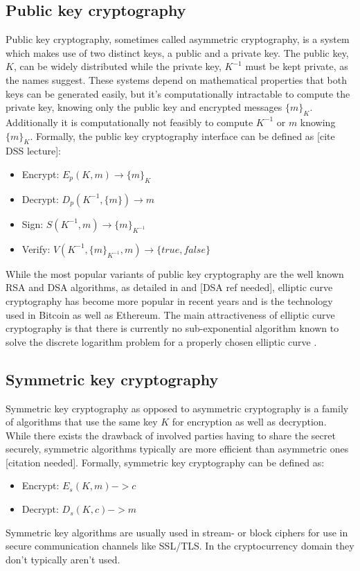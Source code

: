 \documentclass[12pt,msc,a4paper,oneside]{ucl_thesis}
\begin{document}
\subsection{Public key cryptography}
Public key cryptography, sometimes called asymmetric cryptography, is a system which makes use of two distinct keys, a public and a private key. The public key, $K$, can be widely distributed while the private key, $K^{-1}$ must be kept private, as the names suggest. These systems depend on mathematical properties that both keys can be generated easily, but it's computationally intractable to compute the private key, knowing only the public key and encrypted messages $\{m\}_K$. Additionally it is computationally not feasibly to compute $K^{-1}$ or $m$ knowing $\{m\}_K$. Formally, the public key cryptography interface can be defined as [cite DSS lecture]:
\begin{itemize}
    \item{Encrypt: } $E_p(K, m) \rightarrow \{m\}_K$
    \item{Decrypt: } $D_p(K^{-1}, \{m\}) \rightarrow m$
    \item{Sign: }    $S(K^{-1}, m) \rightarrow \{m\}_{K^{-1}}$
    \item{Verify: }  $V(K^{-1}, \{m\}_{K^{-1}}, m) \rightarrow \{true, false\}$
\end{itemize}

While the most popular variants of public key cryptography are the well known RSA and DSA algorithms, as detailed in \cite{RSA:1978:MOD:359340.359342} and [DSA ref needed], elliptic curve cryptography has become more popular in recent years and is the technology used in Bitcoin as well as Ethereum. The main attractiveness of elliptic curve cryptography is that there is currently no sub-exponential algorithm known to solve the discrete logarithm problem for a properly chosen elliptic curve \cite{EllipticCurveOverview}. 

\subsection{Symmetric key cryptography}
Symmetric key cryptography as opposed to asymmetric cryptography is a family of algorithms that use the same key $K$ for encryption as well as decryption. While there exists the drawback of involved parties having to share the secret securely, symmetric algorithms typically are more efficient than asymmetric ones [citation needed]. Formally, symmetric key cryptography can be defined as:
\begin{itemize}
    \item{Encrypt: } $E_s(K, m) -> c$
    \item{Decrypt: } $D_s(K, c) -> m$
\end{itemize}
Symmetric key algorithms are usually used in stream- or block ciphers for use in secure communication channels like SSL/TLS. In the cryptocurrency domain they don't typically aren't used.
\end{document}

